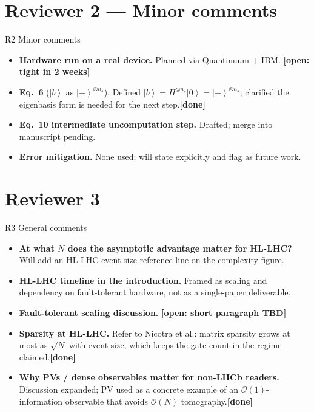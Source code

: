 \documentclass[aspectratio=169]{beamer}
\providecommand{\ket}[1]{\left|#1\right\rangle}
\newcommand{\openflag}[1]{{\color{orange}\textbf{[open: #1]}}}
\newcommand{\done}{{\color{teal}\textbf{[done]}}}
\begin{document}
\section{Reviewer 2 --- Minor comments}
\begin{frame}{R2 Minor comments}
\small
\begin{itemize}
  \item \textbf{Hardware run on a real device.} Planned via Quantinuum + IBM. \openflag{tight in 2 weeks}
  \item \textbf{Eq.\ 6} ($\ket b$ as $\ket+^{\otimes n_s}$). Defined $\ket b = H^{\otimes n_s}\ket 0 = \ket+^{\otimes n_s}$; clarified the eigenbasis form is needed for the next step.\hfill\done
  \item \textbf{Eq.\ 10 intermediate uncomputation step.} Drafted; merge into manuscript pending.
  \item \textbf{Error mitigation.} None used; will state explicitly and flag as future work.
\end{itemize}
\end{frame}

\section{Reviewer 3}

\begin{frame}{R3 General comments}
\begin{itemize}
  \item \textbf{At what $N$ does the asymptotic advantage matter for HL-LHC?} Will add an HL-LHC event-size reference line on the complexity figure.
  \item \textbf{HL-LHC timeline in the introduction.} Framed as scaling and dependency on fault-tolerant hardware, not as a single-paper deliverable.
  \item \textbf{Fault-tolerant scaling discussion.} \openflag{short paragraph TBD}
  \item \textbf{Sparsity at HL-LHC.} Refer to Nicotra et al.: matrix sparsity grows at most as $\sqrt{N}$ with event size, which keeps the gate count in the regime claimed.\hfill\done
  \item \textbf{Why PVs / dense observables matter for non-LHCb readers.} Discussion expanded; PV used as a concrete example of an $\mathcal O(1)$-information observable that avoids $\mathcal O(N)$ tomography.\hfill\done
\end{itemize}
\end{frame}
\end{document}
